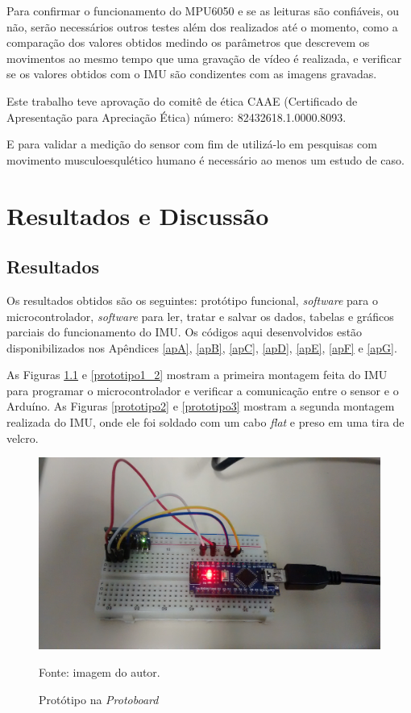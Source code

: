 	Para confirmar o funcionamento do MPU6050  e se as leituras são confiáveis, ou não, serão necessários outros testes além dos realizados até o momento, como a comparação dos valores obtidos medindo os parâmetros que descrevem os movimentos ao mesmo tempo que uma gravação de vídeo é realizada, e verificar se os valores obtidos com o IMU são condizentes com as imagens gravadas. 
	
	Este trabalho teve aprovação do comitê de ética CAAE (Certificado de Apresentação para Apreciação Ética) número: 82432618.1.0000.8093. 
	
	
	E para validar a medição do sensor com fim de  utilizá-lo em pesquisas com movimento musculoesqulético humano é necessário ao menos um estudo de caso.
	
\chapter{Resultados e Discussão}
	\section{Resultados}
	
	
	Os resultados obtidos são os seguintes: protótipo funcional, \textit{software} para o microcontrolador, \textit{software} para ler, tratar e salvar os dados, tabelas e gráficos parciais do funcionamento do IMU. Os códigos aqui desenvolvidos estão disponibilizados nos Apêndices \ref{apA}, \ref{apB}, \ref{apC}, \ref{apD}, \ref{apE}, \ref{apF} e \ref{apG}.
	
	
	As Figuras \ref{prototipo1} e \ref{prototipo1_2} mostram a primeira montagem feita do IMU para programar o microcontrolador e verificar a comunicação entre o sensor e o Arduíno. As Figuras \ref{prototipo2} e \ref{prototipo3} mostram a segunda montagem realizada do IMU, onde ele foi soldado com um cabo \textit{flat} e preso em uma tira de velcro.
	
	\begin{figure}[h]
		\centering
		\includegraphics[keepaspectratio=true,scale=0.15]{figuras/prototipo1.jpg}
		\caption{Protótipo na \textit{Protoboard}}
		Fonte: imagem do autor. 
		\label{prototipo1}	
	\end{figure}
	 
